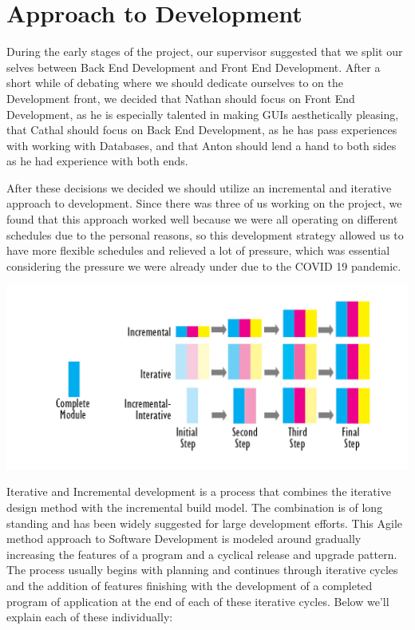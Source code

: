 \section{Approach to Development}
During the early stages of the project, our supervisor suggested that we split our selves between Back End Development and Front End Development. After a short while of debating where we should dedicate ourselves to on the Development front, we decided that Nathan should focus on Front End Development, as he is especially talented in making GUIs aesthetically pleasing, that Cathal should focus on Back End Development, as he has pass experiences with working with Databases, and that Anton should lend a hand to both sides as he had experience with both ends.\par
After these decisions we decided we should utilize an incremental and iterative approach to development. Since there was three of us working on the project, we found that this approach worked well because we were all operating on different schedules due to the personal reasons, so this development strategy allowed us to have more flexible schedules and relieved a lot of pressure, which was essential considering the pressure we were already under due to the COVID 19 pandemic. \par
\includegraphics[scale=1.3]{img/Incremental-Interative-Design-Approach.jpg} \newline
\par Iterative and Incremental development is a process that combines the iterative design method with the incremental build model. The combination is of long standing  and has been widely suggested for large development efforts. This Agile method approach to Software Development is modeled around gradually increasing the features of a program and a cyclical release and upgrade pattern. The process usually begins with planning and continues through iterative cycles and the addition of features finishing with the development of a completed program of application at the end of each of these iterative cycles. Below we'll explain each of these individually:
